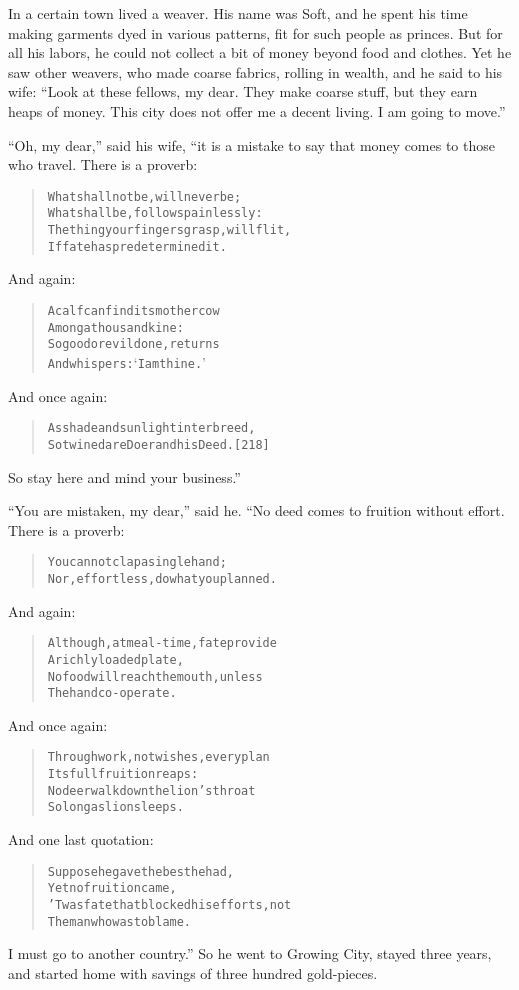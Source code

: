 \documentclass[article, twoside, 14pt]{memoir}
\renewenvironment{verbatim}{%
\begin{quote}%
\vskip -10pt%
\begin{alltt}\normalfont\large}{\end{alltt}%
\end{quote}%
\vskip -10pt
} %
\begin{document}
In a certain town lived a weaver. His name was Soft, and he spent
his time making garments dyed in various patterns, fit for such
people as princes. But for all his labors, he could not collect a
bit of money beyond food and clothes. Yet he saw other weavers, who
made coarse fabrics, rolling in wealth, and he said to his wife:
``Look at these fellows, my dear. They make coarse stuff, but they earn heaps of money. This city does not offer me a decent living. I am going to move.''

``Oh, my dear,'' said his wife, “it is a mistake to say that money
comes to those who travel. There is a proverb:

\begin{verbatim}
What shall not be, will never be;
What shall be, follows painlessly:
The thing your fingers grasp, will flit,
If fate has predetermined it.
\end{verbatim}
And again:

\begin{verbatim}
A calf can find its mother cow
    Among a thousand kine:
So good or evil done, returns
    And whispers: ‘I am thine.’
\end{verbatim}
And once again:

\begin{verbatim}
As shade and sunlight interbreed,
So twined are Doer and his Deed.                        [218]
\end{verbatim}
So stay here and mind your business.”

``You are mistaken, my dear,'' said he. “No deed comes to fruition
without effort. There is a proverb:

\begin{verbatim}
You cannot clap a single hand;
Nor, effortless, do what you planned.
\end{verbatim}
And again:

\begin{verbatim}
Although, at meal-time, fate provide
    A richly loaded plate,
No food will reach the mouth, unless
    The hand co-operate.
\end{verbatim}
And once again:

\begin{verbatim}
Through work, not wishes, every plan
    Its full fruition reaps:
No deer walk down the lion's throat
    So long as lion sleeps.
\end{verbatim}
And one last quotation:

\begin{verbatim}
Suppose he gave the best he had,
    Yet no fruition came,
'Twas fate that blocked his efforts, not
    The man who was to blame.
\end{verbatim}
I must go to another country.” So he went to Growing City, stayed
three years, and started home with savings of three hundred
gold-pieces.
\end{document}
